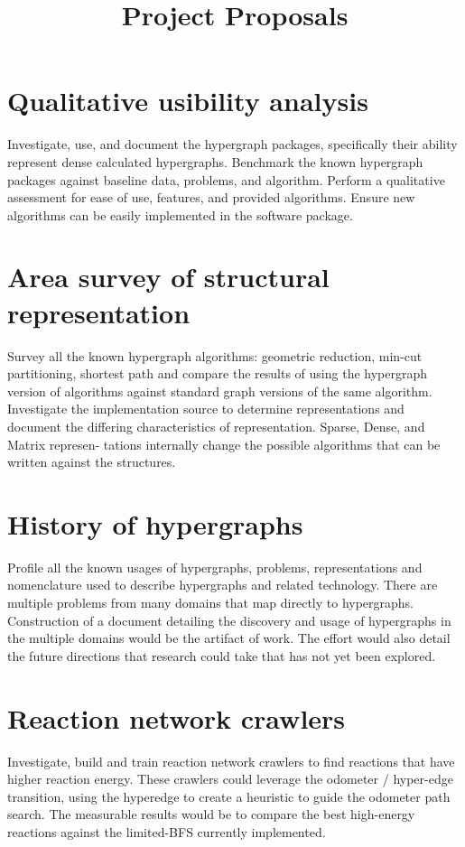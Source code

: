 \documentclass{article}
\title{Project Proposals}
\date{}
\begin{document}
\maketitle

\section{Qualitative usibility analysis}
Investigate, use, and document the hypergraph packages, specifically their ability represent dense calculated hypergraphs. Benchmark the known hypergraph packages against baseline data, problems, and algorithm. Perform a qualitative assessment for ease of use, features, and provided algorithms. Ensure new algorithms can be easily implemented in the software package.

\section{Area survey of structural representation}
Survey all the known hypergraph algorithms: geometric reduction, min-cut partitioning, shortest path and compare the results of using the hypergraph version of algorithms against standard graph versions of the same algorithm. Investigate the implementation source to determine representations and document the differing characteristics of representation. Sparse, Dense, and Matrix represen- tations internally change the possible algorithms that can be written against the structures.

\section{History of hypergraphs}
Profile all the known usages of hypergraphs, problems, representations and nomenclature used to describe hypergraphs and related technology. There are multiple problems from many domains that map directly to hypergraphs. Construction of a document detailing the discovery and usage of hypergraphs in the multiple domains would be the artifact of work. The effort would also detail the future directions that research could take that has not yet been explored.

\section{Reaction network crawlers}
Investigate, build and train reaction network crawlers to find reactions that have higher reaction energy. These crawlers could leverage the odometer / hyper-edge transition, using the hyperedge to create a heuristic to guide the odometer path search. The measurable results would be to compare the best high-energy reactions against the limited-BFS currently implemented.
\end{document}
